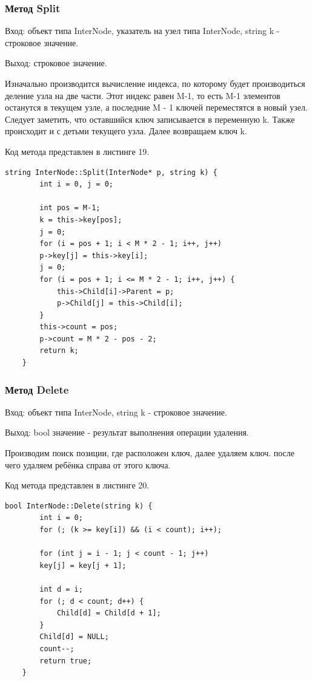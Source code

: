 \documentclass[11pt,a4paper,final]{article} %
\begin{document}
\subsubsection{Метод Split}
Вход: объект типа InterNode, указатель на узел типа InterNode, string k - строковое значение. \par
Выход: строковое значение. \par
Изначально производится вычисление индекса, по которому будет производиться деление узла на две части. Этот индекс равен M-1, то есть M-1 элементов останутся в текущем узле, а последние M - 1 ключей переместятся в новый узел. Следует заметить, что оставшийся ключ записывается в переменную k. Также происходит и с детьми текущего узла. Далее возвращаем ключ k. \par
Код метода представлен в листинге 19.
\begin{lstlisting}[label=Split, caption = Метод Split]
	string InterNode::Split(InterNode* p, string k) {
		int i = 0, j = 0;
		
		int pos = M-1;
		k = this->key[pos];
		j = 0;
		for (i = pos + 1; i < M * 2 - 1; i++, j++)  
		p->key[j] = this->key[i];
		j = 0;
		for (i = pos + 1; i <= M * 2 - 1; i++, j++) { 
			this->Child[i]->Parent = p;
			p->Child[j] = this->Child[i];
		}
		this->count = pos; 
		p->count = M * 2 - pos - 2; 
		return k;
	}
\end{lstlisting}


\subsubsection{Метод Delete}
Вход: объект типа InterNode, string k - строковое значение. \par
Выход: bool значение - результат выполнения операции удаления. \par
Производим поиск позиции, где расположен ключ, далее удаляем ключ. после чего удаляем ребёнка справа от этого ключа. \par
Код метода представлен в листинге 20.
\begin{lstlisting}[label=Delete, caption = Метод Delete]
	bool InterNode::Delete(string k) {
		int i = 0;
		for (; (k >= key[i]) && (i < count); i++);
		
		for (int j = i - 1; j < count - 1; j++)
		key[j] = key[j + 1];
		
		int d = i;
		for (; d < count; d++) {
			Child[d] = Child[d + 1];
		}
		Child[d] = NULL;
		count--;
		return true;
	}
\end{lstlisting}
\end{document}
